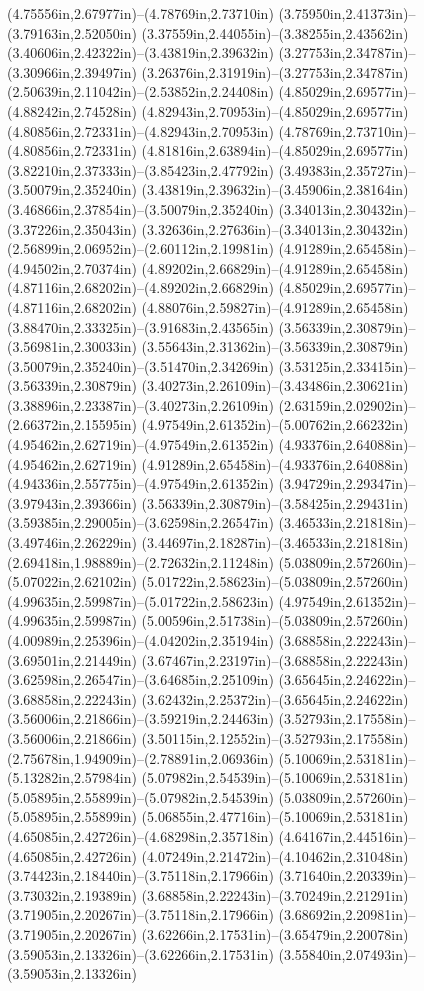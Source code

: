 (4.75556in,2.67977in)--(4.78769in,2.73710in) (3.75950in,2.41373in)--(3.79163in,2.52050in) (3.37559in,2.44055in)--(3.38255in,2.43562in) (3.40606in,2.42322in)--(3.43819in,2.39632in) (3.27753in,2.34787in)--(3.30966in,2.39497in) (3.26376in,2.31919in)--(3.27753in,2.34787in) (2.50639in,2.11042in)--(2.53852in,2.24408in) (4.85029in,2.69577in)--(4.88242in,2.74528in) (4.82943in,2.70953in)--(4.85029in,2.69577in) (4.80856in,2.72331in)--(4.82943in,2.70953in) (4.78769in,2.73710in)--(4.80856in,2.72331in) (4.81816in,2.63894in)--(4.85029in,2.69577in) (3.82210in,2.37333in)--(3.85423in,2.47792in) (3.49383in,2.35727in)--(3.50079in,2.35240in) (3.43819in,2.39632in)--(3.45906in,2.38164in) (3.46866in,2.37854in)--(3.50079in,2.35240in) (3.34013in,2.30432in)--(3.37226in,2.35043in) (3.32636in,2.27636in)--(3.34013in,2.30432in) (2.56899in,2.06952in)--(2.60112in,2.19981in) (4.91289in,2.65458in)--(4.94502in,2.70374in) (4.89202in,2.66829in)--(4.91289in,2.65458in) (4.87116in,2.68202in)--(4.89202in,2.66829in) (4.85029in,2.69577in)--(4.87116in,2.68202in) (4.88076in,2.59827in)--(4.91289in,2.65458in) (3.88470in,2.33325in)--(3.91683in,2.43565in) (3.56339in,2.30879in)--(3.56981in,2.30033in) (3.55643in,2.31362in)--(3.56339in,2.30879in) (3.50079in,2.35240in)--(3.51470in,2.34269in) (3.53125in,2.33415in)--(3.56339in,2.30879in) (3.40273in,2.26109in)--(3.43486in,2.30621in) (3.38896in,2.23387in)--(3.40273in,2.26109in) (2.63159in,2.02902in)--(2.66372in,2.15595in) (4.97549in,2.61352in)--(5.00762in,2.66232in) (4.95462in,2.62719in)--(4.97549in,2.61352in) (4.93376in,2.64088in)--(4.95462in,2.62719in) (4.91289in,2.65458in)--(4.93376in,2.64088in) (4.94336in,2.55775in)--(4.97549in,2.61352in) (3.94729in,2.29347in)--(3.97943in,2.39366in) (3.56339in,2.30879in)--(3.58425in,2.29431in) (3.59385in,2.29005in)--(3.62598in,2.26547in) (3.46533in,2.21818in)--(3.49746in,2.26229in) (3.44697in,2.18287in)--(3.46533in,2.21818in) (2.69418in,1.98889in)--(2.72632in,2.11248in) (5.03809in,2.57260in)--(5.07022in,2.62102in) (5.01722in,2.58623in)--(5.03809in,2.57260in) (4.99635in,2.59987in)--(5.01722in,2.58623in) (4.97549in,2.61352in)--(4.99635in,2.59987in) (5.00596in,2.51738in)--(5.03809in,2.57260in) (4.00989in,2.25396in)--(4.04202in,2.35194in) (3.68858in,2.22243in)--(3.69501in,2.21449in) (3.67467in,2.23197in)--(3.68858in,2.22243in) (3.62598in,2.26547in)--(3.64685in,2.25109in) (3.65645in,2.24622in)--(3.68858in,2.22243in) (3.62432in,2.25372in)--(3.65645in,2.24622in) (3.56006in,2.21866in)--(3.59219in,2.24463in) (3.52793in,2.17558in)--(3.56006in,2.21866in) (3.50115in,2.12552in)--(3.52793in,2.17558in) (2.75678in,1.94909in)--(2.78891in,2.06936in) (5.10069in,2.53181in)--(5.13282in,2.57984in) (5.07982in,2.54539in)--(5.10069in,2.53181in) (5.05895in,2.55899in)--(5.07982in,2.54539in) (5.03809in,2.57260in)--(5.05895in,2.55899in) (5.06855in,2.47716in)--(5.10069in,2.53181in) (4.65085in,2.42726in)--(4.68298in,2.35718in) (4.64167in,2.44516in)--(4.65085in,2.42726in) (4.07249in,2.21472in)--(4.10462in,2.31048in) (3.74423in,2.18440in)--(3.75118in,2.17966in) (3.71640in,2.20339in)--(3.73032in,2.19389in) (3.68858in,2.22243in)--(3.70249in,2.21291in) (3.71905in,2.20267in)--(3.75118in,2.17966in) (3.68692in,2.20981in)--(3.71905in,2.20267in) (3.62266in,2.17531in)--(3.65479in,2.20078in) (3.59053in,2.13326in)--(3.62266in,2.17531in) (3.55840in,2.07493in)--(3.59053in,2.13326in) 